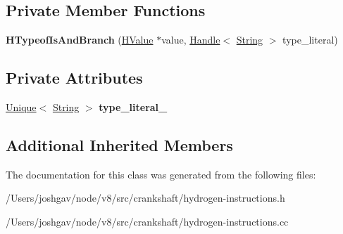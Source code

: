 \subsection*{Private Member Functions}
\begin{DoxyCompactItemize}
\item 
{\bfseries H\+Typeof\+Is\+And\+Branch} (\hyperlink{classv8_1_1internal_1_1_h_value}{H\+Value} $\ast$value, \hyperlink{classv8_1_1internal_1_1_handle}{Handle}$<$ \hyperlink{classv8_1_1internal_1_1_string}{String} $>$ type\+\_\+literal)\hypertarget{classv8_1_1internal_1_1_h_typeof_is_and_branch_a1c9773b8597f10b5023130b3382b53a2}{}\label{classv8_1_1internal_1_1_h_typeof_is_and_branch_a1c9773b8597f10b5023130b3382b53a2}

\end{DoxyCompactItemize}
\subsection*{Private Attributes}
\begin{DoxyCompactItemize}
\item 
\hyperlink{classv8_1_1internal_1_1_unique}{Unique}$<$ \hyperlink{classv8_1_1internal_1_1_string}{String} $>$ {\bfseries type\+\_\+literal\+\_\+}\hypertarget{classv8_1_1internal_1_1_h_typeof_is_and_branch_abf240a019626b069f6feda7d4bd0d38b}{}\label{classv8_1_1internal_1_1_h_typeof_is_and_branch_abf240a019626b069f6feda7d4bd0d38b}

\end{DoxyCompactItemize}
\subsection*{Additional Inherited Members}


The documentation for this class was generated from the following files\+:\begin{DoxyCompactItemize}
\item 
/\+Users/joshgav/node/v8/src/crankshaft/hydrogen-\/instructions.\+h\item 
/\+Users/joshgav/node/v8/src/crankshaft/hydrogen-\/instructions.\+cc\end{DoxyCompactItemize}
